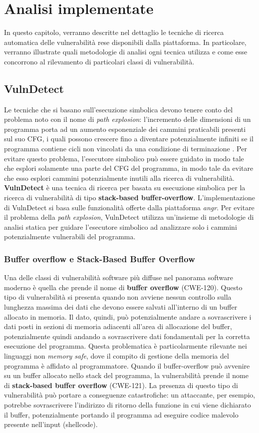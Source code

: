 \documentclass[../main.tex]{subfiles}
\begin{document}
\chapter{Analisi implementate}
In questo capitolo, verranno descritte nel dettaglio le tecniche di ricerca automatica delle vulnerabilità rese disponibili dalla piattaforma.
In particolare, verranno illustrate quali metodologie di analisi ogni tecnica utilizza e come esse concorrono al rilevamento
di particolari classi di vulnerabilità.
\section{VulnDetect}
Le tecniche che si basano sull'esecuzione simbolica devono tenere conto del problema noto con il nome di \textit{path explosion}: l'incremento delle
dimensioni di un programma porta ad un aumento esponenziale dei cammini praticabili presenti sul suo CFG, i quali possono crescere fino a diventare
potenzialmente infiniti se il programma contiene cicli non vincolati da una condizione di terminazione \cite{SE_Path_explosion}. 
Per evitare questo problema, l'esecutore simbolico può essere guidato in modo tale che esplori solamente una parte del CFG del programma, in modo tale da evitare che esso
esplori cammini potenzialmente inutili alla ricerca di vulnerabilità. \textbf{VulnDetect} \cite{VulnDetect} è una tecnica di ricerca per basata su esecuzione simbolica per la ricerca
di vulnerabilità di tipo \textbf{stack-based buffer-overflow}. L'implementazione di VulnDetect si basa sulle funzionalità offerte dalla piattaforma \textit{angr}.
Per evitare il problema della \textit{path explosion}, VulnDetect utilizza un'insieme di metodologie di analisi statica per guidare
l'esecutore simbolico ad analizzare solo i cammini potenzialmente vulnerabili del programma.
\subsection{Buffer overflow e Stack-Based Buffer Overflow}
Una delle classi di vulnerabilità software più diffuse nel panorama software moderno è quella che prende il nome di \textbf{buffer overflow} (CWE-120).
Questo tipo di vulnerabilità si presenta quando non avviene nessun controllo sulla lunghezza massima dei dati che devono essere salvati all'interno
di un buffer allocato in memoria. Il dato, quindi, può potenzialmente andare a sovrascrivere i dati posti in sezioni di memoria adiacenti all'area di allocazione
del buffer, potenzialmente quindi andando a sovrascrivere dati fondamentali per la corretta esecuzione del programma. 
Questa problematica è particolarmente rilevante nei linguaggi non \textit{memory safe}, dove il compito di gestione della memoria del programma è affidato
al programmatore. Quando il buffer-overflow può avvenire su un buffer allocato nello stack del programma, la vulnerabilità prende il nome di \textbf{stack-based buffer overflow} (CWE-121).
La presenza di questo tipo di vulnerabilità può portare a conseguenze catastrofiche: un attaccante, per esempio, potrebbe sovrascrivere l'indirizzo di ritorno della funzione in cui viene dichiarato il buffer, 
potenzialmente portando il programma ad eseguire codice malevolo presente nell'input (shellcode).
\end{document}
